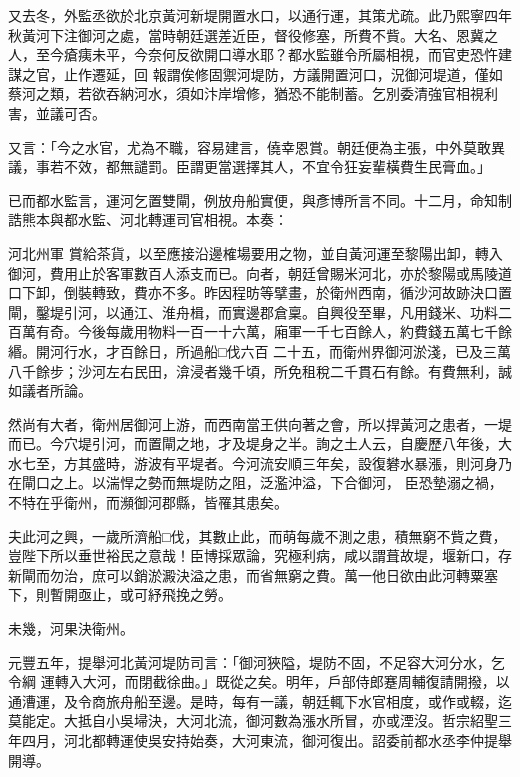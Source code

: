 \begin{pinyinscope}
 又去冬，外監丞欲於北京黃河新堤開置水口，以通行運，其策尤疏。此乃熙寧四年秋黃河下注御河之處，當時朝廷選差近臣，督役修塞，所費不貲。大名、恩冀之人，至今瘡痍未平，今奈何反欲開口導水耶？都水監雖令所屬相視，而官吏恐忤建謀之官，止作遷延，回
 報謂俟修固禦河堤防，方議開置河口，況御河堤道，僅如蔡河之類，若欲吞納河水，須如汴岸增修，猶恐不能制蓄。乞別委清強官相視利害，並議可否。



 又言：「今之水官，尤為不職，容易建言，僥幸恩賞。朝廷便為主張，中外莫敢異議，事若不效，都無譴罰。臣謂更當選擇其人，不宜令狂妄輩橫費生民膏血。」



 已而都水監言，運河乞置雙閘，例放舟船實便，與彥博所言不同。十二月，命知制誥熊本與都水監、河北轉運司官相視。本奏：



 河北州軍
 賞給茶貨，以至應接沿邊榷場要用之物，並自黃河運至黎陽出卸，轉入御河，費用止於客軍數百人添支而已。向者，朝廷曾賜米河北，亦於黎陽或馬陵道口下卸，倒裝轉致，費亦不多。昨因程昉等擘畫，於衛州西南，循沙河故跡決口置閘，鑿堤引河，以通江、淮舟楫，而實邊郡倉稟。自興役至畢，凡用錢米、功料二百萬有奇。今後每歲用物料一百一十六萬，廂軍一千七百餘人，約費錢五萬七千餘緡。開河行水，才百餘日，所過船□伐六百
 二十五，而衛州界御河淤淺，已及三萬八千餘步；沙河左右民田，渰浸者幾千頃，所免租稅二千貫石有餘。有費無利，誠如議者所論。



 然尚有大者，衛州居御河上游，而西南當王供向著之會，所以捍黃河之患者，一堤而已。今穴堤引河，而置閘之地，才及堤身之半。詢之土人云，自慶歷八年後，大水七至，方其盛時，游波有平堤者。今河流安順三年矣，設復礬水暴漲，則河身乃在閘口之上。以湍悍之勢而無堤防之阻，泛濫沖溢，下合御河，
 臣恐墊溺之禍，不特在乎衛州，而瀕御河郡縣，皆罹其患矣。



 夫此河之興，一歲所濟船□伐，其數止此，而萌每歲不測之患，積無窮不貲之費，豈陛下所以垂世裕民之意哉！臣博採眾論，究極利病，咸以謂葺故堤，堰新口，存新閘而勿治，庶可以銷淤澱決溢之患，而省無窮之費。萬一他日欲由此河轉粟塞下，則暫開亟止，或可紓飛挽之勞。



 未幾，河果決衛州。



 元豐五年，提舉河北黃河堤防司言：「御河狹隘，堤防不固，不足容大河分水，乞令綱
 運轉入大河，而閉截徐曲。」既從之矣。明年，戶部侍郎蹇周輔復請開撥，以通漕運，及令商旅舟船至邊。是時，每有一議，朝廷輒下水官相度，或作或輟，迄莫能定。大抵自小吳埽決，大河北流，御河數為漲水所冒，亦或湮沒。哲宗紹聖三年四月，河北都轉運使吳安持始奏，大河東流，御河復出。詔委前都水丞李仲提舉開導。




\end{pinyinscope}

